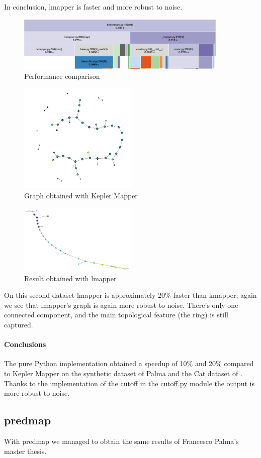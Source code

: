 In conclusion, lmapper is faster and more robust to noise.

\begin{figure}[h]
	\caption{Performance comparison}
	\centering
	\includegraphics[width=0.9\textwidth]{images/benchmark/cat/benchmark}
\end{figure}
\begin{figure}[h]
	\caption{Graph obtained with Kepler Mapper}
	\centering
	\includegraphics[width=0.5\textwidth]{images/benchmark/cat/benchmark_kmapper}
\end{figure}
\begin{figure}[h]
	\caption{Result obtained with lmapper}
	\centering
	\includegraphics[width=0.5\textwidth]{images/benchmark/cat/benchmark_lmapper}
\end{figure}
On this second dataset lmapper is approximately 20\% faster than kmapper; again we see that lmapper's graph is again more robust to noise. There's only one connected component, and the main topological feature (the ring) is still captured.
\paragraph{Conclusions}
The pure Python implementation obtained a speedup of 10\% and 20\% compared to Kepler Mapper on the synthetic dataset of Palma and the Cat dataset of \cite{pythonmapper}. Thanks to the implementation of the cutoff in the cutoff.py module the output is more robust to noise.

\subsection{predmap}
With predmap we managed to obtain the same results of Francesco Palma's master thesis.

